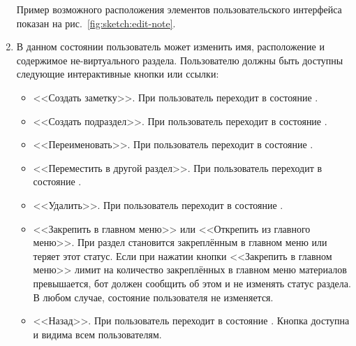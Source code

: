 \begin{enumerate}
            Пример возможного расположения элементов пользовательского интерфейса показан на
            рис.~\ref{fig:sketch:edit-note}.

        \item \label{itm:req:ui:states:edit-section}

            В данном состоянии пользователь может изменить имя, расположение и содержимое не-виртуального
            раздела.
            Пользователю должны быть доступны следующие интерактивные кнопки или ссылки:
            \begin{itemize}
                \item
                    <<Создать заметку>>.
                    При  пользователь переходит в состояние
                    \hyperref[itm:req:ui:states:create-note]
                    {}.
                \item
                    <<Создать подраздел>>.
                    При  пользователь переходит в состояние
                    \hyperref[itm:req:ui:states:create-section]
                    {}.
                \item
                    <<Переименовать>>.
                    При  пользователь переходит в состояние
                    \hyperref[itm:req:ui:states:rename-kbo]
                    {}.
                \item
                    <<Переместить в другой раздел>>.
                    При  пользователь переходит в состояние
                    \hyperref[itm:req:ui:states:move-kbo]
                    {}.
                \item
                    <<Удалить>>.
                    При  пользователь переходит в состояние
                    \hyperref[itm:req:ui:states:delete-kbo]
                    {}.
                \item
                    <<Закрепить в главном меню>> или <<Открепить из главного меню>>.
                    При  раздел становится закреплённым в главном меню или теряет этот
                    статус. Если при нажатии кнопки <<Закрепить в главном меню>> лимит на количество
                    закреплённых в главном меню материалов превышается, бот должен сообщить об
                    этом и не изменять статус раздела. В любом случае, состояние пользователя
                    не изменяется.
                \item
                    <<Назад>>.
                    При  пользователь переходит в состояние
                    \hyperref[itm:req:ui:states:navx]
                    {}.
                    Кнопка доступна и видима всем пользователям.
            \end{itemize}


\end{enumerate}
